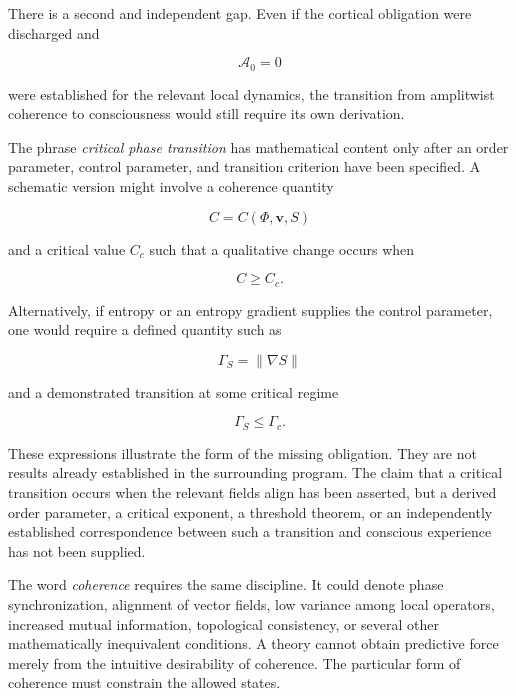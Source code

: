 \documentclass[11pt]{article}
\begin{document}
There is a second and independent gap. Even if the cortical obligation were discharged and

\begin{equation}
\mathcal A_0=0
\end{equation}

were established for the relevant local dynamics, the transition from amplitwist coherence to consciousness would still require its own derivation.

The phrase \emph{critical phase transition} has mathematical content only after an order parameter, control parameter, and transition criterion have been specified. A schematic version might involve a coherence quantity

\begin{equation}
C=C(\Phi,\mathbf v,S)
\end{equation}

and a critical value $C_c$ such that a qualitative change occurs when

\begin{equation}
C\geq C_c.
\end{equation}

Alternatively, if entropy or an entropy gradient supplies the control parameter, one would require a defined quantity such as

\begin{equation}
\Gamma_S=\|\nabla S\|
\end{equation}

and a demonstrated transition at some critical regime

\begin{equation}
\Gamma_S\leq\Gamma_c.
\end{equation}

These expressions illustrate the form of the missing obligation. They are not results already established in the surrounding program. The claim that a critical transition occurs when the relevant fields align has been asserted, but a derived order parameter, a critical exponent, a threshold theorem, or an independently established correspondence between such a transition and conscious experience has not been supplied.

The word \emph{coherence} requires the same discipline. It could denote phase synchronization, alignment of vector fields, low variance among local operators, increased mutual information, topological consistency, or several other mathematically inequivalent conditions. A theory cannot obtain predictive force merely from the intuitive desirability of coherence. The particular form of coherence must constrain the allowed states.
\end{document}
